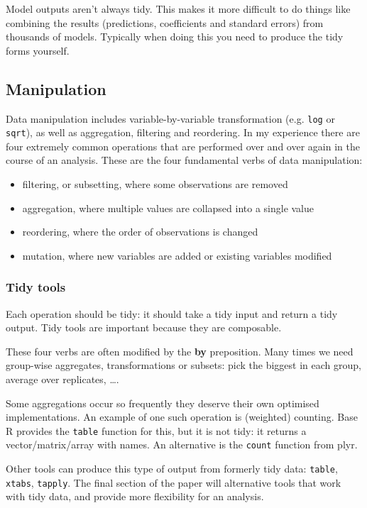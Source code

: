 \documentclass[oneside]{article}
\begin{document}
Model outputs aren't always tidy. This makes it more difficult to do things like combining the results (predictions, coefficients and standard errors) from thousands of models. Typically when doing this you need to produce the tidy forms yourself.

\subsection{Manipulation}

Data manipulation includes variable-by-variable transformation (e.g. {\tt log} or {\tt sqrt}), as well as aggregation, filtering and reordering. In my experience there are four extremely common operations that are performed over and over again in the course of an analysis. These are the four fundamental verbs of data manipulation:

\begin{itemize}

\item filtering, or subsetting, where some observations are removed
\item aggregation, where multiple values are collapsed into a single value
\item reordering, where the order of observations is changed
\item mutation, where new variables are added or existing variables modified 

\end{itemize}

\subsubsection{Tidy tools}

Each operation should be tidy: it should take a tidy input and return a tidy output. Tidy tools are important because they are composable.

These four verbs are often modified by the \textbf{by} preposition. Many times we need group-wise aggregates, transformations or subsets: pick the biggest in each group, average over replicates, \ldots.  

Some aggregations occur so frequently they deserve their own optimised implementations. An example of one such operation is (weighted) counting. Base R provides the {\tt table} function for this, but it is not tidy: it returns a vector/matrix/array with names. An alternative is the {\tt count} function from plyr.

Other tools can produce this type of output from formerly tidy data: {\tt table}, {\tt xtabs}, {\tt tapply}. The final section of the paper will alternative tools that work with tidy data, and provide more flexibility for an analysis.
\end{document}
